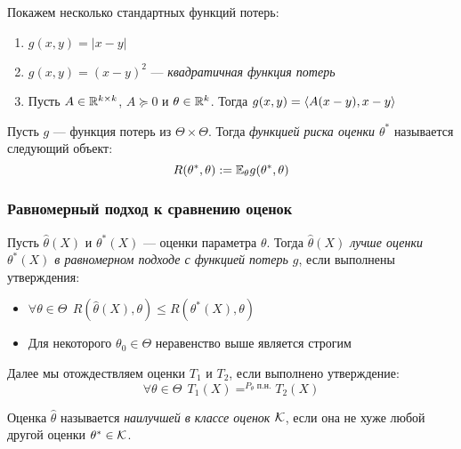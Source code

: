 \begin{example}
	Покажем несколько стандартных функций потерь:
	\begin{enumerate}
		\item $g(x, y) = |x - y|$
		
		\item $g(x, y) = (x - y)^2$ --- \textit{квадратичная функция потерь}
		
		\item Пусть $A \in \mathbb{R}^{k \times k}$, $A \succeq 0$ и $\theta \in \mathbb{R}^k$. Тогда $g(x, y) = \left\langle A(x - y), x - y\right\rangle$
	\end{enumerate}
\end{example}

\begin{definition}
	Пусть $g$ --- функция потерь из $\Theta \times \Theta$. Тогда \textit{функцией риска оценки $\theta^*$} называется следующий объект:
	\[
		R(\theta^*, \theta) := \mathbb{E}_\theta g(\theta^*, \theta)
	\]
\end{definition}

\subsubsection{Равномерный подход к сравнению оценок}

\begin{definition}
	Пусть $\hat{\theta}(X)$ и $\theta^*(X)$ --- оценки параметра $\theta$. Тогда \textit{$\hat{\theta}(X)$ лучше оценки $\theta^*(X)$ в равномерном подходе с функцией потерь $g$}, если выполнены утверждения:
	\begin{itemize}
		\item $\forall \theta \in \Theta\ \ R(\hat{\theta}(X), \theta) \le R(\theta^*(X), \theta)$
		
		\item Для некоторого $\theta_0 \in \Theta$ неравенство выше является строгим
	\end{itemize}
\end{definition}

\begin{note}
	Далее мы отождествляем оценки $T_1$ и $T_2$, если выполнено утверждение:
	\[
		\forall \theta \in \Theta\ \ T_1(X) =^{P_{\theta}\text{ п.н.}} T_2(X)
	\]
\end{note}

\begin{definition}
	Оценка $\hat{\theta}$ называется \textit{наилучшей в классе оценок $\mathcal{K}$}, если она не хуже любой другой оценки $\theta^* \in \mathcal{K}$.
\end{definition}


